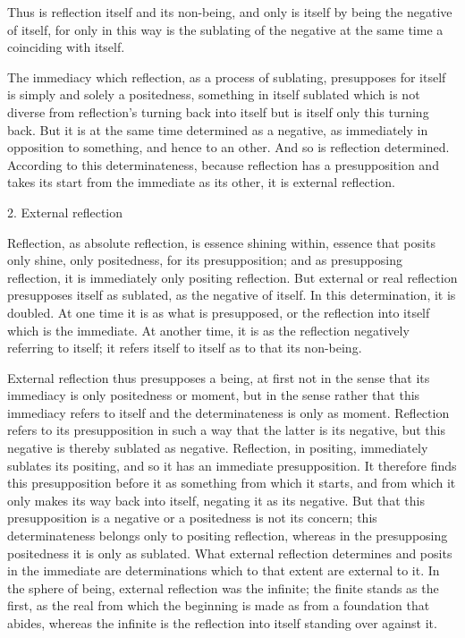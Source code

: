 Thus is reflection itself and its non-being,
and only is itself by being the negative of itself,
for only in this way is the sublating of the negative
at the same time a coinciding with itself.

The immediacy which reflection,
as a process of sublating,
presupposes for itself is
simply and solely a positedness,
something in itself sublated
which is not diverse from
reflection's turning back into itself
but is itself only this turning back.
But it is at the same time determined as a negative,
as immediately in opposition to something,
and hence to an other.
And so is reflection determined.
According to this determinateness,
because reflection has a presupposition
and takes its start from the immediate as its other,
it is external reflection.

2. External reflection

Reflection, as absolute reflection,
is essence shining within,
essence that posits only shine,
only positedness, for its presupposition;
and as presupposing reflection,
it is immediately only positing reflection.
But external or real reflection
presupposes itself as sublated,
as the negative of itself.
In this determination, it is doubled.
At one time it is as what is presupposed,
or the reflection into itself which is the immediate.
At another time, it is as the reflection
negatively referring to itself;
it refers itself to itself as
to that its non-being.

External reflection thus presupposes a being,
at first not in the sense that
its immediacy is only positedness or moment,
but in the sense rather that
this immediacy refers to itself
and the determinateness is only as moment.
Reflection refers to its presupposition in such a way
that the latter is its negative,
but this negative is thereby sublated as negative.
Reflection, in positing, immediately sublates its positing,
and so it has an immediate presupposition.
It therefore finds this presupposition before it
as something from which it starts,
and from which it only makes its way back into itself,
negating it as its negative.
But that this presupposition is a negative
or a positedness is not its concern;
this determinateness belongs only to positing reflection,
whereas in the presupposing positedness
it is only as sublated.
What external reflection determines and posits in the immediate
are determinations which to that extent are external to it.
In the sphere of being, external reflection was the infinite;
the finite stands as the first,
as the real from which the beginning is made
as from a foundation that abides,
whereas the infinite is the reflection into itself
standing over against it.

